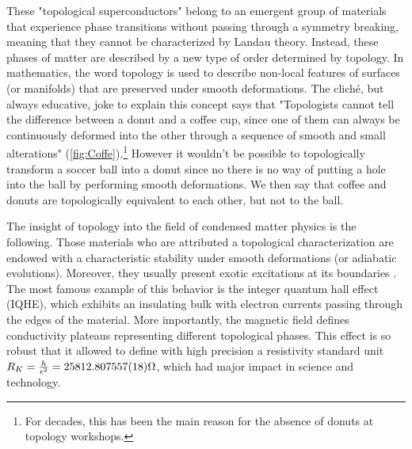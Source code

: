 These "topological superconductors" belong to an emergent group of materials that experience phase transitions without passing through a symmetry breaking, meaning that they cannot be characterized by Landau theory. Instead, these phases of matter are described by  a new type of  order determined by topology. In mathematics, the word topology is used to describe non-local features of surfaces (or manifolds) that are preserved under smooth deformations. The clich\'e, but always educative, joke to explain this concept says that "Topologists cannot tell the difference between a donut and a coffee cup, since one of them 
can always be continuously deformed into the other through a
sequence of smooth and small alterations" (\ref{fig:Coffe}).\footnote{For decades, this has been the main reason for the absence of donuts at topology workshops.} However it wouldn't be possible to topologically transform a soccer ball into  a donut since no there is no way of putting  a hole into the ball by performing smooth deformations. We then say that coffee and donuts are topologically equivalent to each other, but not to the ball. 



The insight of topology into  the field of condensed matter physics is the following. Those materials who are attributed a topological characterization are endowed with a characteristic stability under smooth deformations (or adiabatic evolutions). Moreover, they usually present exotic excitations at its boundaries . The most famous example of this behavior is the integer quantum hall effect (IQHE), which exhibits an insulating bulk with electron currents passing through the edges of the material. More importantly, the magnetic field defines conductivity plateaus representing different topological phases. This effect is so robust that it allowed to define with high precision a resistivity standard unit $ R_K =\frac{h}{\epsilon^2} = 25812.807557(18) \Omega$, which had major impact in science and technology. 


